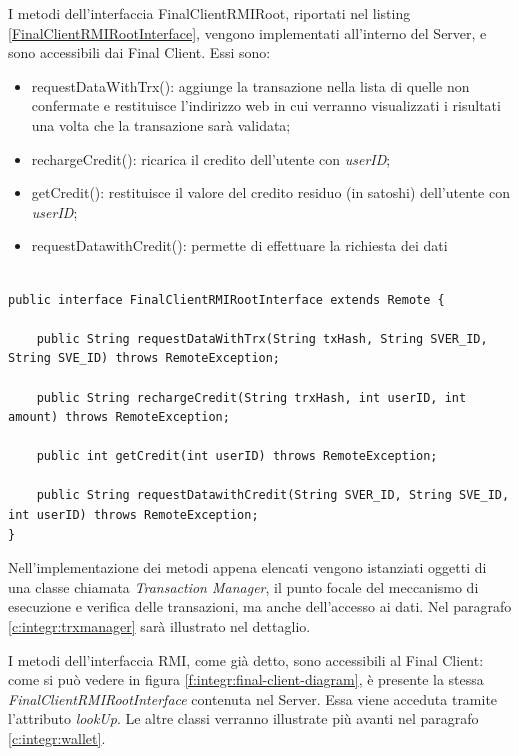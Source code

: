 I metodi dell'interfaccia FinalClientRMIRoot, riportati nel listing \ref{FinalClientRMIRootInterface}, vengono implementati all'interno del Server, e sono accessibili dai Final Client. Essi sono:

\begin{itemize}
    \item requestDataWithTrx(): aggiunge la transazione nella lista di quelle non confermate e restituisce l'indirizzo web in cui verranno visualizzati i risultati una volta che la transazione sarà validata;
    \item rechargeCredit(): ricarica il credito dell'utente con \textit{userID};
    \item getCredit(): restituisce il valore del credito residuo (in satoshi) dell'utente con \textit{userID};
    \item requestDatawithCredit(): permette di effettuare la richiesta dei dati 
\end{itemize}

\begin{lstlisting}[caption={FinalClientRMIRootInterface.java},label={FinalClientRMIRootInterface},style={c}]

public interface FinalClientRMIRootInterface extends Remote {
    
    public String requestDataWithTrx(String txHash, String SVER_ID, String SVE_ID) throws RemoteException;
    
    public String rechargeCredit(String trxHash, int userID, int amount) throws RemoteException;
    
    public int getCredit(int userID) throws RemoteException;
    
    public String requestDatawithCredit(String SVER_ID, String SVE_ID, int userID) throws RemoteException;
}

\end{lstlisting}

Nell'implementazione dei metodi appena elencati vengono istanziati oggetti di una classe chiamata \textit{Transaction Manager}, il punto focale del meccanismo di esecuzione e verifica delle transazioni, ma anche dell'accesso ai dati. Nel paragrafo \ref{c:integr:trxmanager} sarà illustrato nel dettaglio.

I metodi dell'interfaccia RMI, come già detto, sono accessibili al Final Client: come si può vedere in figura \ref{f:integr:final-client-diagram}, è presente la stessa \textit{FinalClientRMIRootInterface} contenuta nel Server. Essa viene acceduta tramite l'attributo \textit{lookUp}. Le altre classi verranno illustrate più avanti nel paragrafo \ref{c:integr:wallet}.

